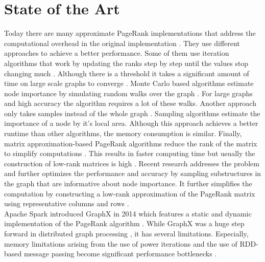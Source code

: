 \documentclass[a4paper,12pt]{article}
\begin{document}
\section{State of the Art}
Today there are many approximate PageRank implementations that address the computational overhead in the original implementation \cite{wu_efficient_2024}. They use different approaches to achieve a better performance. Some of them use iteration algorithms that work by updating the ranks step by step until the values stop changing much \cite{xie_parameterized_2023}\cite{anikin_efficient_2022}. Although there is a threshold it takes a significant amount of time on large scale graphs to converge \cite{wu_efficient_2024}. Monte Carlo based algorithms estimate node importance by simulating random walks over the graph \cite{breyer_markovian_nodate}\cite{noauthor_pdf_2024}. For large graphs and high accuracy the algorithm requires a lot of these walks. Another approach only takes samples instead of the whole graph \cite{wu_approxrank_2009}\cite{noauthor_local_nodate}. Sampling algorithms estimate the importance of a node by it's local area. Although this approach achieves a better runtime than other algorithms, the memory consumption is similar. Finally, matrix approximation-based PageRank algorithms reduce the rank of the matrix to simplify computations \cite{noauthor_fast_nodate}. This results in faster computing time but usually the construction of low-rank matrices is high . Recent research addresses the problem and further optimizes the performance and accuracy by sampling substructures in the graph that are informative about node importance. It further simplifies the computation by constructing a low-rank approximation of the PageRank matrix using representative columns and rows \cite{wu_efficient_2024}. \\Apache Spark introduced GraphX in 2014 which features a static and dynamic implementation of the PageRank algorithm \cite{noauthor_graphx_nodate}. While GraphX was a huge step forward in distributed graph processing \cite{gonzalez_graphx_nodate}, it has several limitations. %
Especially, memory limitations arising from the use of power iterations \cite{page_pagerank_1999} and the use of RDD-based message passing become significant performance bottlenecks \cite{xin_graphx_2014}\cite{xin_graphx_2013}.
 
\end{document}
